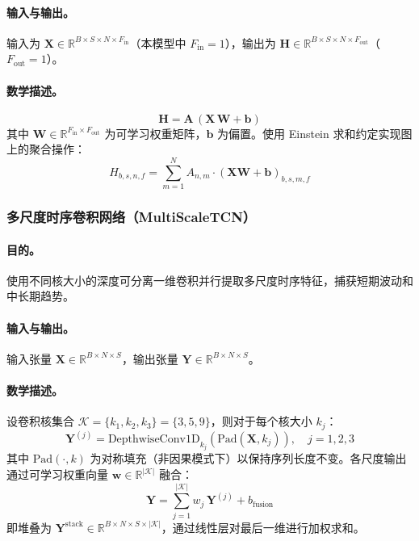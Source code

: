 \documentclass[UTF8]{ctexart}
\begin{document}
\paragraph{输入与输出。}
输入为 $\mathbf{X} \in \mathbb{R}^{B \times S \times N \times F_{\text{in}}}$（本模型中 $F_{\text{in}}=1$），输出为 $\mathbf{H} \in \mathbb{R}^{B \times S \times N \times F_{\text{out}}}$（$F_{\text{out}}=1$）。

\paragraph{数学描述。}
\begin{equation}
    \mathbf{H} = \mathbf{A} \, (\mathbf{X} \, \mathbf{W} + \mathbf{b})
\end{equation}
其中 $\mathbf{W} \in \mathbb{R}^{F_{\text{in}} \times F_{\text{out}}}$ 为可学习权重矩阵，$\mathbf{b}$ 为偏置。使用 Einstein 求和约定实现图上的聚合操作：
\begin{equation}
    H_{b,s,n,f} = \sum_{m=1}^{N} A_{n,m} \cdot (\mathbf{X} \mathbf{W} + \mathbf{b})_{b,s,m,f}
\end{equation}

\subsubsection{多尺度时序卷积网络（MultiScaleTCN）}

\paragraph{目的。}
使用不同核大小的深度可分离一维卷积并行提取多尺度时序特征，捕获短期波动和中长期趋势。

\paragraph{输入与输出。}
输入张量 $\mathbf{X} \in \mathbb{R}^{B \times N \times S}$，输出张量 $\mathbf{Y} \in \mathbb{R}^{B \times N \times S}$。

\paragraph{数学描述。}
设卷积核集合 $\mathcal{K} = \{k_1, k_2, k_3\} = \{3, 5, 9\}$，则对于每个核大小 $k_j$：
\begin{equation}
    \mathbf{Y}^{(j)} = \mathrm{DepthwiseConv1D}_{k_j}\!\left(\mathrm{Pad}(\mathbf{X}, k_j)\right), \quad j = 1, 2, 3
\end{equation}
其中 $\mathrm{Pad}(\cdot, k)$ 为对称填充（非因果模式下）以保持序列长度不变。各尺度输出通过可学习权重向量 $\mathbf{w} \in \mathbb{R}^{|\mathcal{K}|}$ 融合：
\begin{equation}
    \mathbf{Y} = \sum_{j=1}^{|\mathcal{K}|} w_j \, \mathbf{Y}^{(j)} + b_{\text{fusion}}
\end{equation}
即堆叠为 $\mathbf{Y}^{\text{stack}} \in \mathbb{R}^{B \times N \times S \times |\mathcal{K}|}$，通过线性层对最后一维进行加权求和。
\end{document}
